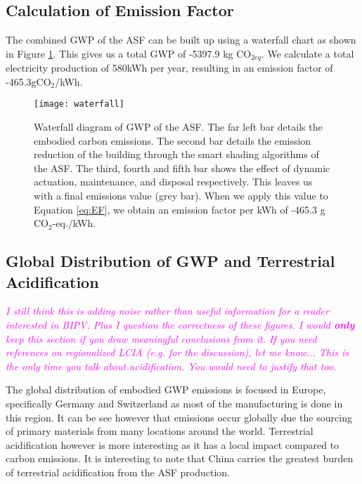 \subsection{Calculation of Emission Factor}
The combined GWP of the ASF can be built up using a waterfall chart as shown in  Figure \ref{fig:waterfall}. This gives us a total GWP of -5397.9 kg CO$_{2eq}$. We calculate a total electricity production of 580kWh per year, resulting in an emission factor of -465.3gCO${_2}$/kWh.

\begin{figure}[H]
\begin{center}
\texttt{[image: waterfall]}
\caption{Waterfall diagram of GWP of the ASF. The far left bar details the embodied carbon emissions. The second bar details the emission reduction of the building through the smart shading algorithms of the ASF. The third, fourth and fifth bar shows the effect of dynamic actuation, maintenance, and disposal respectively. This leaves us with a final emissions value (grey bar). When we apply this value to Equation \ref{eq:EF}, we obtain an emission factor per kWh of -465.3 g CO$_2$-eq./kWh.}

\label{fig:waterfall}
\end{center}
\end{figure}

\subsection{Global Distribution of GWP and Terrestrial Acidification}
\textcolor{magenta}{\textit{I still think this is adding noise rather than useful information for a reader interested in BIPV. Plus I question the correctness of these figures. I would \textbf{only} keep this section if you draw meaningful conclusions from it. If you need references on regionalized LCIA (e.g. for the discussion), let me know... This is the only time you talk about acidification. You would need to justify that too.}}

The global distribution of embodied GWP emissions is focused in Europe, specifically Germany and Switzerland as most of the manufacturing is done in this region. It can be see however that emissions occur globally due the sourcing of primary materials from many locations around the world. Terrestrial acidification however is more interesting as it has a local impact compared to carbon emissions. It is interesting to note that China carries the greatest burden of terrestrial acidification from the ASF production.
 
